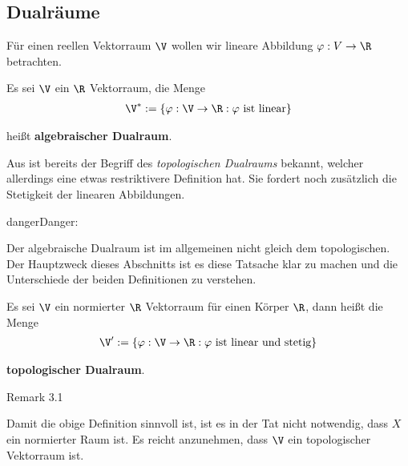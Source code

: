 \subsection{Dualräume}
\label{\detokenize{vektoranalysis/multilinear:dualraume}}
\par
Für einen reellen Vektorraum \(\V\) wollen wir lineare Abbildung \(\varphi:V\to\R\) betrachten.
\label{vektoranalysis/multilinear:definition-0}
\begin{definition}{}{}



\par
Es sei \(\V\) ein \(\R\) Vektorraum, die Menge
\begin{align*}
\V^\ast := \{\varphi:\V\rightarrow\R: \varphi\text{ ist linear}\}
\end{align*}
\par
heißt \textbf{algebraischer Dualraum}.
\end{definition}

\par
Aus \cite{Ten21} ist bereits der Begriff des \emph{topologischen Dualraums} bekannt, welcher allerdings eine etwas restriktivere Definition hat. Sie fordert noch zusätzlich die Stetigkeit der linearen Abbildungen.

\begin{sphinxadmonition}{danger}{Danger:}
\par
Der algebraische Dualraum ist im allgemeinen nicht gleich dem topologischen. Der Hauptzweck dieses Abschnitts ist es diese Tatsache klar zu machen und die Unterschiede der beiden Definitionen zu verstehen.
\end{sphinxadmonition}
\label{vektoranalysis/multilinear:definition-1}
\begin{definition}{}{}



\par
Es sei \(\V\) ein normierter \(\R\) Vektorraum für einen Körper \(\R\), dann heißt die Menge
\begin{align*}
\V^\prime := \{\varphi:\V\rightarrow\R: \varphi\text{ ist linear und stetig}\}
\end{align*}
\par
\textbf{topologischer Dualraum}.
\end{definition}
\label{vektoranalysis/multilinear:remark-2}
\begin{emphBox}{}{}{Remark 3.1}



\par
Damit die obige Definition sinnvoll ist, ist es in der Tat nicht notwendig, dass \(X\) ein normierter Raum ist. Es reicht anzunehmen, dass \(\V\) ein topologischer Vektorraum ist.
\end{emphBox}

